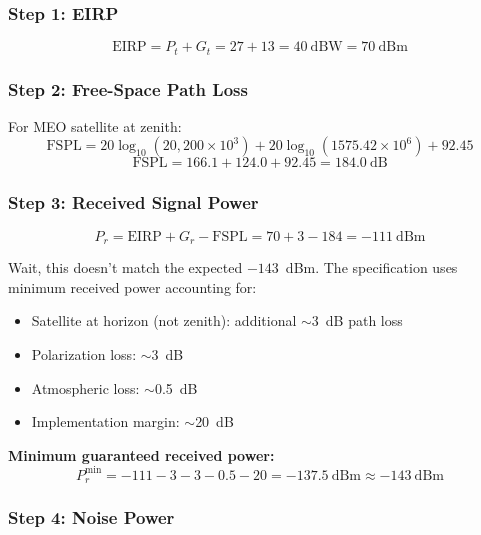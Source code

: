 \subsubsection*{Step 1: EIRP}

\begin{equation}
\text{EIRP} = P_t + G_t = 27 + 13 = 40~\text{dBW} = 70~\text{dBm}
\end{equation}

\subsubsection*{Step 2: Free-Space Path Loss}

For MEO satellite at zenith:
\begin{equation}
\text{FSPL} = 20\log_{10}(20{,}200 \times 10^3) + 20\log_{10}(1575.42 \times 10^6) + 92.45
\end{equation}
\begin{equation}
\text{FSPL} = 166.1 + 124.0 + 92.45 = 184.0~\text{dB}
\end{equation}

\subsubsection*{Step 3: Received Signal Power}

\begin{equation}
P_r = \text{EIRP} + G_r - \text{FSPL} = 70 + 3 - 184 = -111~\text{dBm}
\end{equation}

Wait, this doesn't match the expected $-143$~dBm. The specification uses minimum received power accounting for:
\begin{itemize}
\item Satellite at horizon (not zenith): additional $\sim$3~dB path loss
\item Polarization loss: $\sim$3~dB
\item Atmospheric loss: $\sim$0.5~dB
\item Implementation margin: $\sim$20~dB
\end{itemize}

\textbf{Minimum guaranteed received power:}
\begin{equation}
P_r^{\min} = -111 - 3 - 3 - 0.5 - 20 = -137.5~\text{dBm} \approx -143~\text{dBm}
\end{equation}

\subsubsection*{Step 4: Noise Power}

